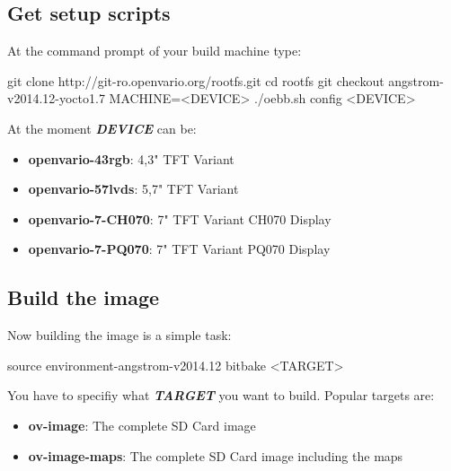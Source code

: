 \subsection{Get setup scripts}

At the command prompt of your build machine type:

\begin{verbatim*}
git clone http://git-ro.openvario.org/rootfs.git
cd rootfs
git checkout angstrom-v2014.12-yocto1.7
MACHINE=<DEVICE> ./oebb.sh config <DEVICE>
\end{verbatim*}

At the moment \textbf{\textit{DEVICE}} can be:

\begin{itemize}
	\item \textbf{openvario-43rgb}: 4,3" TFT Variant
	\item \textbf{openvario-57lvds}: 5,7" TFT Variant
	\item \textbf{openvario-7-CH070}: 7" TFT Variant CH070 Display
	\item \textbf{openvario-7-PQ070}: 7" TFT Variant PQ070 Display
\end{itemize}

\subsection{Build the image}
Now building the image is a simple task:

\begin{verbatim*}
source environment-angstrom-v2014.12
bitbake <TARGET>
\end{verbatim*}

You have to specifiy what \textbf{\textit{TARGET}} you want to build. Popular targets are:
\begin{itemize}
	\item \textbf{ov-image}: The complete SD Card image
	\item \textbf{ov-image-maps}: The complete SD Card image including the maps
\end{itemize}

